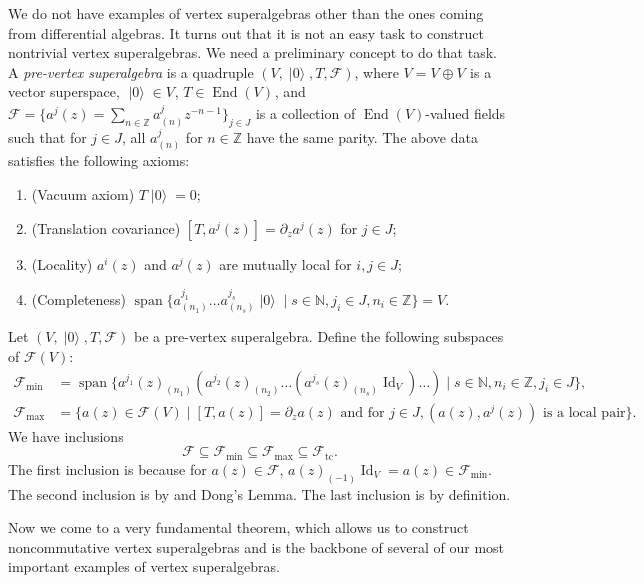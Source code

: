 \documentclass[a4paper, 12pt, reqno]{amsart}
\theoremstyle{remark}
\numberwithin{equation}{subsection}
\DeclareMathOperator{\Id}{Id}
\DeclareMathOperator{\End}{End}
\DeclareMathOperator{\vspan}{span}
\DeclareMathOperator{\vac}{|0\rangle}
\DeclareMathOperator{\zero}{\overline{0}}
\DeclareMathOperator{\one}{\overline{1}}
\DeclareMathOperator{\tc}{tc}
\begin{document}
We do not have examples of vertex superalgebras other than the ones coming from differential algebras.
It turns out that it is not an easy task to construct nontrivial vertex superalgebras.
We need a preliminary concept to do that task.
A \emph{pre-vertex superalgebra} is a quadruple $(V, \vac, T, \mathcal{F})$, where $V = V_{\zero} \oplus V_{\one}$ is a vector superspace, $\vac \in V_{\zero}$, $T \in \End(V)_{\zero}$, and $\mathcal{F} = \{a^j(z) = \sum_{n \in \mathbb{Z}}a^j_{(n)}z^{-n - 1}\}_{j \in J}$ is a collection of $\End(V)$-valued fields such that for $j \in J$, all $a^j_{(n)}$ for $n \in \mathbb{Z}$ have the same parity.
The above data satisfies the following axioms:
\begin{enumerate}
\item (Vacuum axiom) $T\vac = 0$;
\item (Translation covariance) $[T, a^j(z)] = \partial_za^j(z)$ for $j \in J$;
\item (Locality) $a^i(z)$ and $a^j(z)$ are mutually local for $i, j \in J$;
\item (Completeness) $\vspan\{a^{j_1}_{(n_1)}\dots a^{j_s}_{(n_s)}\vac \mid s \in \mathbb{N}, j_i \in J, n_i \in \mathbb{Z}\} = V$.
\end{enumerate}

Let $(V, \vac, T, \mathcal{F})$ be a pre-vertex superalgebra.
Define the following subspaces of $\mathcal{F}(V)$:
\begin{align*}
  \mathcal{F}_{\min} &= \vspan\{a^{j_1}(z)_{(n_1)}(a^{j_2}(z)_{(n_2)}\dots(a^{j_s}(z)_{(n_s)}\Id_V)\dots) \mid s \in \mathbb{N}, n_i \in \mathbb{Z}, j_i \in J\}, \\
  \mathcal{F}_{\max} &= \{a(z) \in \mathcal{F}(V) \mid [T, a(z)] = \partial_za(z)\text{ and for }j \in J, (a(z), a^j(z))\text{ is a local pair}\}.
\end{align*}
We have inclusions
\begin{equation*}
  \mathcal{F} \subseteq \mathcal{F}_{\min} \subseteq \mathcal{F}_{\max} \subseteq \mathcal{F}_{\tc}.
\end{equation*}
The first inclusion is because for $a(z) \in \mathcal{F}$, $a(z)_{(-1)}\Id_V = a(z) \in \mathcal{F}_{\min}$.
The second inclusion is by  and Dong's Lemma.
The last inclusion is by definition.

Now we come to a very fundamental theorem, which allows us to construct noncommutative vertex superalgebras and is the backbone of several of our most important examples of vertex superalgebras.
\end{document}

